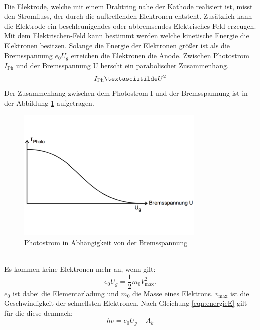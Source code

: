 \\Die Elektrode, welche mit einem Drahtring nahe der Kathode realisiert ist, misst den Stromfluss, der durch die auftreffenden Elektronen entsteht. Zusätzlich kann die Elektrode ein beschleunigendes oder abbremsendes Elektrisches-Feld erzeugen. Mit dem Elektrischen-Feld kann bestimmt werden welche kinetische Energie die Elektronen besitzen. Solange die Energie der Elektronen größer ist als die Bremsspannung $e_0U_g$ erreichen die Elektronen die Anode. Zwischen Photostrom $I_{\text{Ph}}$ und der Bremsspannung U herscht ein parabolischer Zusammenhang.
\begin{equation*}
  I_{\text{Ph}}\textasciitilde U^2
\label{eqn:e0ug}
\end{equation*}
 Der Zusammenhang zwischen dem Photostrom I und der Bremsspannung ist in der Abbildung \ref{fig:500-5} aufgetragen.
\begin{figure}[h!]
  \centering
  \includegraphics[width=0.8\textwidth]{500-5.pdf}
  \caption{Photostrom in Abhängigkeit von der Bremsspannung \cite{1}}
  \label{fig:500-5}
\end{figure}
\\Es kommen keine Elektronen mehr an, wenn gilt:
\begin{equation}
  e_0U_g=\frac{1}{2}m_0V^2_{\text{max}}.
\label{eqn:e0ug}
\end{equation}
$e_0$ ist dabei die Elementarladung und $m_0$ die Masse eines Elektrons. $v_{\text{max}}$ ist die Geschwindigkeit der schnellsten Elektronen.
Nach Gleichung \ref{eqn:energieE} gilt für die diese demnach:
\begin{equation}
  h\nu= e_0U_g-A_k
\label{eqn:schnellE}
\end{equation}
